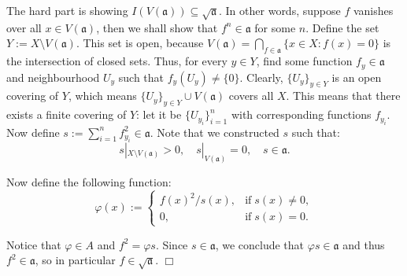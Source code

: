 \documentclass{template}
\newcommand{\qedwhite}{\hfill \ensuremath{\Box}}
\begin{document}
The hard part is showing $I(V(\mathfrak{a})) \subseteq \sqrt{\mathfrak{a}}$. In
other words, suppose $f$ vanishes over all $x \in V(\mathfrak{a})$, then we
shall show that $f^n \in \mathfrak{a}$ for some $n$. Define the set $Y := X
\setminus V(\mathfrak{a})$. This set is open, because
$V(\mathfrak{a})=\bigcap_{f \in \mathfrak{a}} \{x \in X: f(x)=0\}$ is the
intersection of closed sets. Thus, for every $y \in Y$, find some function $f_y
\in \mathfrak{a}$ and neighbourhood $U_y$ such that $f_y(U_y) \neq \{0\}$.
Clearly, $\{U_y\}_{y \in Y}$ is an open covering of $Y$, which means $\{U_y\}_{y
\in Y} \cup V(\mathfrak{a})$ covers all $X$. This means that there exists a
finite covering of $Y$: let it be $\{U_{y_i}\}_{i=1}^n$ with corresponding
functions $f_{y_i}$. Now define $s := \sum_{i=1}^n f_{y_i}^2 \in \mathfrak{a}$.
Note that we constructed $s$ such that:
\begin{equation*}
    s|_{X\setminus V(\mathfrak{a})} > 0, \quad s|_{V(\mathfrak{a})} = 0, \quad s \in \mathfrak{a}.
\end{equation*}

Now define the following function:
\begin{equation*}
    \varphi(x) := \begin{cases}
        f(x)^2/s(x), & \text{if} \; s(x) \neq 0, \\
        0, & \text{if} \; s(x) = 0.
    \end{cases}
\end{equation*}

Notice that $\varphi \in A$ and $f^2 = \varphi s$. Since $s \in \mathfrak{a}$,
we conclude that $\varphi s \in \mathfrak{a}$ and thus $f^2 \in \mathfrak{a}$,
so in particular $f \in \sqrt{\mathfrak{a}}$. \qedwhite
\end{document}
